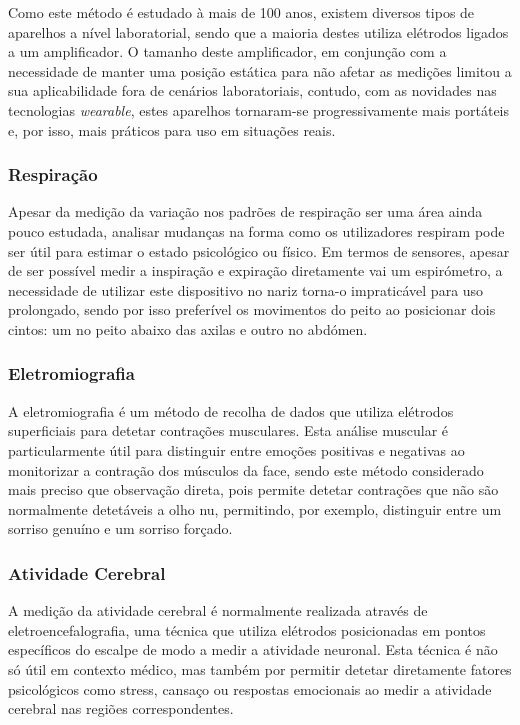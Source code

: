 Como este método é estudado à mais de 100 anos, existem diversos tipos de aparelhos a nível laboratorial, sendo que a maioria destes utiliza elétrodos ligados a um amplificador. O tamanho deste amplificador, em conjunção com a necessidade de manter uma posição estática para não afetar as medições limitou a sua aplicabilidade fora de cenários laboratoriais, contudo, com as novidades nas tecnologias \textit{wearable}, estes aparelhos tornaram-se progressivamente mais portáteis e, por isso, mais práticos para uso em situações reais.

\subsubsection{Respiração}

Apesar da medição da variação nos padrões de respiração ser uma área ainda pouco estudada, analisar mudanças na forma como os utilizadores respiram pode ser útil para estimar o estado psicológico ou físico. Em termos de sensores, apesar de ser possível medir a inspiração e expiração diretamente vai um espirómetro, a necessidade de utilizar este dispositivo no nariz torna-o impraticável para uso prolongado, sendo por isso preferível os movimentos do peito ao posicionar dois cintos: um no peito abaixo das axilas e outro no abdómen.

\subsubsection{Eletromiografia}

A eletromiografia é um método de recolha de dados que utiliza elétrodos superficiais para detetar contrações musculares. Esta análise muscular é particularmente útil para distinguir entre emoções positivas e negativas ao monitorizar a contração dos músculos da face, sendo este método considerado mais preciso que observação direta, pois permite detetar contrações que não são normalmente detetáveis a olho nu, permitindo, por exemplo, distinguir entre um sorriso genuíno e um sorriso forçado.

\subsubsection{Atividade Cerebral}

A medição da atividade cerebral é normalmente realizada através de eletroencefalografia, uma técnica que utiliza elétrodos posicionadas em pontos específicos do escalpe de modo a medir a atividade neuronal. Esta técnica é não só útil em contexto médico, mas também por permitir detetar diretamente fatores psicológicos como stress, cansaço ou respostas emocionais ao medir a atividade cerebral nas regiões correspondentes.

